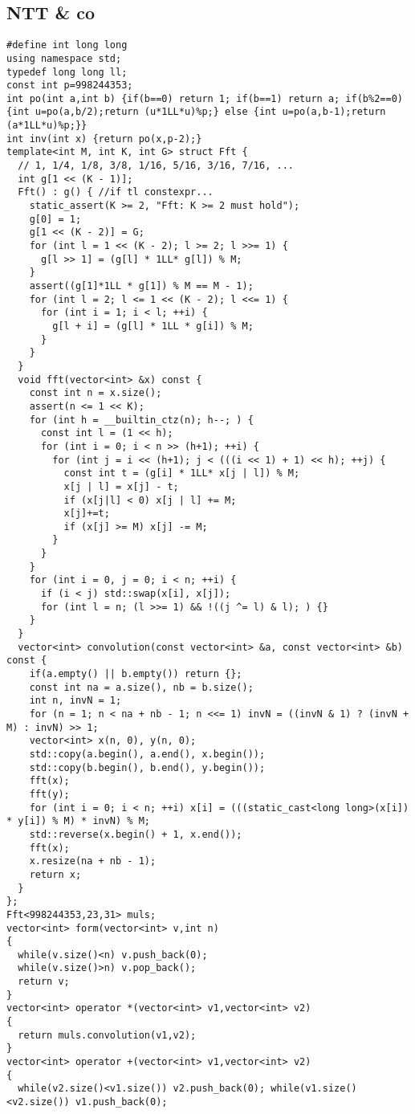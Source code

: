 \subsection{NTT \& co}
\begin{lstlisting}
#define int long long
using namespace std;
typedef long long ll;
const int p=998244353;
int po(int a,int b) {if(b==0) return 1; if(b==1) return a; if(b%2==0) {int u=po(a,b/2);return (u*1LL*u)%p;} else {int u=po(a,b-1);return (a*1LL*u)%p;}}
int inv(int x) {return po(x,p-2);}
template<int M, int K, int G> struct Fft {
  // 1, 1/4, 1/8, 3/8, 1/16, 5/16, 3/16, 7/16, ...
  int g[1 << (K - 1)];
  Fft() : g() { //if tl constexpr...
    static_assert(K >= 2, "Fft: K >= 2 must hold");
    g[0] = 1;
    g[1 << (K - 2)] = G;
    for (int l = 1 << (K - 2); l >= 2; l >>= 1) {
      g[l >> 1] = (g[l] * 1LL* g[l]) % M;
    }
    assert((g[1]*1LL * g[1]) % M == M - 1);
    for (int l = 2; l <= 1 << (K - 2); l <<= 1) {
      for (int i = 1; i < l; ++i) {
        g[l + i] = (g[l] * 1LL * g[i]) % M;
      }
    }
  }
  void fft(vector<int> &x) const {
    const int n = x.size();
    assert(n <= 1 << K);
    for (int h = __builtin_ctz(n); h--; ) {
      const int l = (1 << h);
      for (int i = 0; i < n >> (h+1); ++i) {
        for (int j = i << (h+1); j < (((i << 1) + 1) << h); ++j) {
          const int t = (g[i] * 1LL* x[j | l]) % M;
          x[j | l] = x[j] - t;
          if (x[j|l] < 0) x[j | l] += M;
          x[j]+=t;
          if (x[j] >= M) x[j] -= M;
        }
      }
    }
    for (int i = 0, j = 0; i < n; ++i) {
      if (i < j) std::swap(x[i], x[j]);
      for (int l = n; (l >>= 1) && !((j ^= l) & l); ) {}
    }
  }
  vector<int> convolution(const vector<int> &a, const vector<int> &b) const {
    if(a.empty() || b.empty()) return {};
    const int na = a.size(), nb = b.size();
    int n, invN = 1;
    for (n = 1; n < na + nb - 1; n <<= 1) invN = ((invN & 1) ? (invN + M) : invN) >> 1;
    vector<int> x(n, 0), y(n, 0);
    std::copy(a.begin(), a.end(), x.begin());
    std::copy(b.begin(), b.end(), y.begin());
    fft(x);
    fft(y);
    for (int i = 0; i < n; ++i) x[i] = (((static_cast<long long>(x[i]) * y[i]) % M) * invN) % M;
    std::reverse(x.begin() + 1, x.end());
    fft(x);
    x.resize(na + nb - 1);
    return x;
  }
};
Fft<998244353,23,31> muls;
vector<int> form(vector<int> v,int n)
{
  while(v.size()<n) v.push_back(0);
  while(v.size()>n) v.pop_back();
  return v;
}
vector<int> operator *(vector<int> v1,vector<int> v2)
{
  return muls.convolution(v1,v2);
}
vector<int> operator +(vector<int> v1,vector<int> v2)
{
  while(v2.size()<v1.size()) v2.push_back(0); while(v1.size()<v2.size()) v1.push_back(0);

\end{lstlisting}
